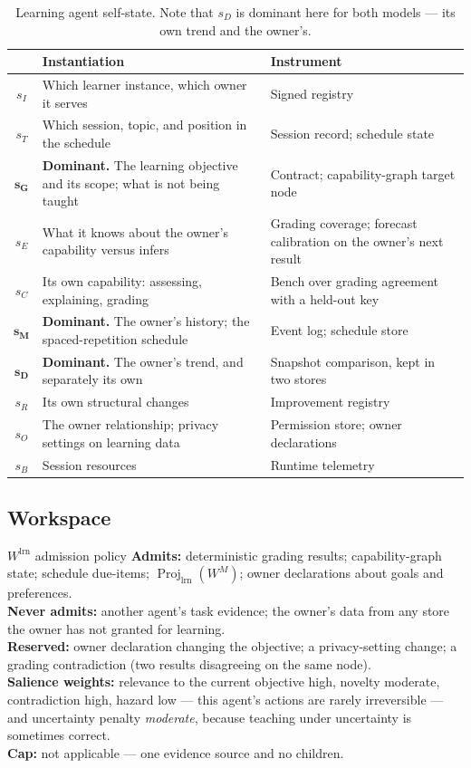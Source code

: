 \documentclass[11pt]{article}
\newcommand{\Proj}{\operatorname{Proj}}
\begin{document}
\begin{table}[h]
\centering\small
\caption{Learning agent self-state. Note that $s_D$ is dominant here for both models --- its own trend and the owner's.}
\label{tab:lrn-state}
\begin{tabular}{@{}cL{5.6cm}L{6.4cm}@{}}
\toprule
& \textbf{Instantiation} & \textbf{Instrument} \\
\midrule
$s_I$ & Which learner instance, which owner it serves & Signed registry \\
$s_T$ & Which session, topic, and position in the schedule & Session record; schedule state \\
$\mathbf{s_G}$ & \textbf{Dominant.} The learning objective and its scope; what is not being taught & Contract; capability-graph target node \\
$s_E$ & What it knows about the owner's capability versus infers & Grading coverage; forecast calibration on the owner's next result \\
$s_C$ & Its own capability: assessing, explaining, grading & Bench over grading agreement with a held-out key \\
$\mathbf{s_M}$ & \textbf{Dominant.} The owner's history; the spaced-repetition schedule & Event log; schedule store \\
$\mathbf{s_D}$ & \textbf{Dominant.} The owner's trend, and separately its own & Snapshot comparison, kept in two stores \\
$s_R$ & Its own structural changes & Improvement registry \\
$s_O$ & The owner relationship; privacy settings on learning data & Permission store; owner declarations \\
$s_B$ & Session resources & Runtime telemetry \\
\bottomrule
\end{tabular}
\end{table}

\subsection{Workspace}

\begin{specbox}{$W^{\mathrm{lrn}}$ admission policy}
\textbf{Admits:} deterministic grading results; capability-graph state; schedule due-items; $\Proj_{\mathrm{lrn}}(W^{M})$; owner declarations about goals and preferences.\\[3pt]
\textbf{Never admits:} another agent's task evidence; the owner's data from any store the owner has not granted for learning.\\[3pt]
\textbf{Reserved:} owner declaration changing the objective; a privacy-setting change; a grading contradiction (two results disagreeing on the same node).\\[3pt]
\textbf{Salience weights:} relevance to the current objective high, novelty moderate, contradiction high, hazard low --- this agent's actions are rarely irreversible --- and uncertainty penalty \emph{moderate}, because teaching under uncertainty is sometimes correct.\\[3pt]
\textbf{Cap:} not applicable --- one evidence source and no children.
\end{specbox}
\end{document}
